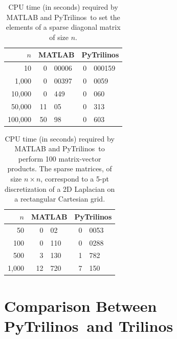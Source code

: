 \documentclass[acmtocl]{acmtrans2m}
\newcommand{\PyTrilinos}{{PyTrilinos}}
\begin{document}
\begin{table}
  \begin{center}
    \begin{tabular}{|r|r@{.}l|r@{.}l|}
      \hline
      $n$ & \multicolumn{2}{c|}{MATLAB} &
      \multicolumn{2}{c|}{PyTrilinos} \\
      \hline
      \hline
           10 &  0&00006 & 0&000159 \\
        1,000 &  0&00397 & 0&0059   \\
       10,000 &  0&449   & 0&060    \\
       50,000 & 11&05    & 0&313    \\
      100,000 & 50&98    & 0&603    \\
      \hline
    \end{tabular}
    \caption{CPU time (in seconds) required by MATLAB and
      \PyTrilinos\ to set the elements of a sparse diagonal matrix of
      size $n$.}
    \label{tab:matlab_sparse}
  \end{center}
\end{table}

\begin{table}
  \begin{center}
    \begin{tabular}{|r|r@{.}l|r@{.}l|}
      \hline
      $n$ & \multicolumn{2}{c|}{MATLAB} &
      \multicolumn{2}{c|}{PyTrilinos} \\
      \hline
      \hline
         50 &  0&02  & 0&0053 \\
        100 &  0&110 & 0&0288 \\
        500 &  3&130 & 1&782  \\
      1,000 & 12&720 & 7&150  \\
      \hline
    \end{tabular}
    \caption{CPU time (in seconds) required by MATLAB and
      \PyTrilinos\ to perform 100 matrix-vector products.  The sparse
      matrices, of size $n \times n$, correspond to a 5-pt
      discretization of a 2D Laplacian on a rectangular Cartesian
      grid.}
    \label{tab:matlab_matvec}
  \end{center}
\end{table}

\section{Comparison Between \PyTrilinos\ and Trilinos}
\label{sec:comparison_trilinos}
\end{document}
